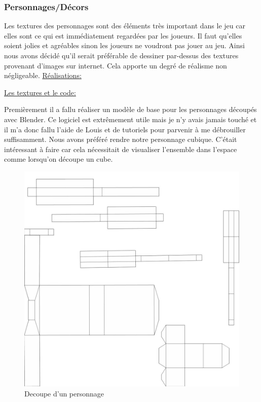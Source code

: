 \documentclass{article}
\begin{document}
\subsubsection{Personnages/Décors}

\par
Les textures des personnages sont des éléments très important dans le jeu car elles sont ce qui est immédiatement regardées par les joueurs. Il faut qu’elles soient jolies et agréables sinon les joueurs ne voudront pas jouer au jeu. Ainsi nous avons décidé qu’il serait préférable de dessiner par-dessus des textures provenant d’images sur internet. Cela apporte un degré de réalisme non négligeable.
\newline
\newline
\underline{Réalisations:}

\par
\underline{Les textures et le code:}
\newline

\par
Premièrement il a fallu réaliser un modèle de base pour les personnages découpés avec Blender.  Ce logiciel est extrêmement utile mais je n’y avais jamais touché et il m’a donc fallu l’aide de Louis et de tutoriels pour parvenir à me débrouiller suffisamment. Nous avons préféré rendre notre personnage cubique. C’était intéressant à faire car cela nécessitait de visualiser l’ensemble dans l’espace comme lorsqu’on découpe un cube.

\begin{figure}[h]
\begin{center}
\includegraphics[scale=0.25]{decoupe.jpg}
\caption{Decoupe d'un personnage}
\end{center}
\end{figure}
\end{document}
